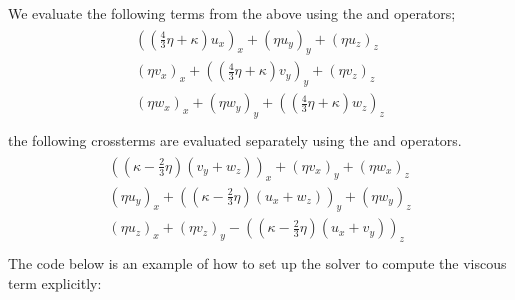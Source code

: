 \documentclass[letterpaper,10pt,english]{sphinxmanual}
\begin{document}
\sphinxAtStartPar
We evaluate the following terms from the above using the  and  operators;
\begin{align*}\!\begin{aligned}
( (\frac{4}{3} \eta + \kappa) u_x)_x + (              \eta           u_y)_y + (\eta u_z)_z\\
(\eta           v_x)_x + ( (\frac{4}{3} \eta + \kappa) v_y)_y + (\eta v_z)_z\\
(\eta w_x)_x                        + (              \eta           w_y)_y + ( (\frac{4}{3} \eta + \kappa) w_z)_z\\
\end{aligned}\end{align*}
\sphinxAtStartPar
the following cross\sphinxhyphen{}terms are evaluated separately using the  and  operators.
\begin{align*}\!\begin{aligned}
( (\kappa - \frac{2}{3} \eta) (v_y + w_z) )_x + (\eta v_x)_y  + (\eta w_x)_z\\
(\eta u_y)_x + ( (\kappa - \frac{2}{3} \eta) (u_x + w_z) )_y  + (\eta w_y)_z\\
(\eta u_z)_x + (\eta v_z)_y - ( (\kappa - \frac{2}{3} \eta) (u_x + v_y) )_z\\
\end{aligned}\end{align*}
\sphinxAtStartPar
The code below is an example of how to set up the solver to compute the
viscous term  explicitly:
\end{document}
